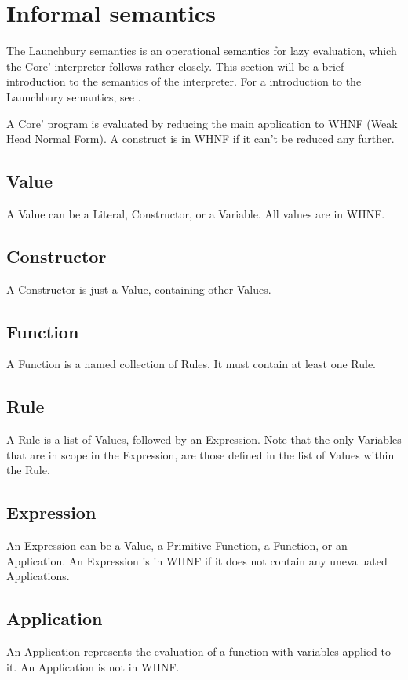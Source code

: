 \section{Informal semantics}

The Launchbury semantics is an operational semantics for 
lazy evaluation, which the Core' interpreter follows rather closely. 
This section will be a brief introduction to the semantics of the interpreter.
For a introduction to 
the Launchbury semantics, see \cite{launchbury1993natural}. 

A Core' program is evaluated by reducing the main application to WHNF 
(Weak Head Normal Form). A construct is in WHNF if it can't be
reduced any further.

\subsection{Value}
A Value can be a Literal, Constructor, or a Variable. All values are in WHNF.

\subsection{Constructor}
A Constructor is just a Value, containing other Values.

\subsection{Function}
A Function is a named collection of Rules. It must contain at least one Rule.

\subsection{Rule}
A Rule is a list of Values, followed by an Expression. Note that the only Variables
that are in scope in the Expression, are those defined in the list of Values within 
the Rule.

\subsection{Expression}
An Expression can be a Value, a Primitive-Function, a Function, or an Application.
An Expression is in WHNF if it does not contain any unevaluated Applications.

\subsection{Application}
An Application represents the evaluation of a function with variables applied to it.
An Application is not in WHNF.


